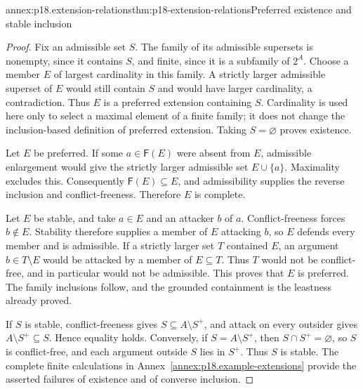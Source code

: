 \begin{annexitem}{annex:p18.extension-relations}{thm:p18-extension-relations}{Preferred existence and stable inclusion}
\begin{proof}
Fix an admissible set \(S\). The family of its admissible supersets is
nonempty, since it contains \(S\), and finite, since it is a subfamily
of \(2^A\). Choose a member \(E\) of largest cardinality in this
family. A strictly larger admissible superset of \(E\) would still
contain \(S\) and would have larger cardinality, a contradiction.
Thus \(E\) is a preferred extension containing \(S\). Cardinality is
used here only to select a maximal element of a finite family; it does not
change the inclusion-based definition of preferred extension. Taking
\(S=\varnothing\) proves existence.

Let \(E\) be preferred. If some \(a\in\mathsf F(E)\) were absent
from \(E\), admissible enlargement would give the strictly larger
admissible set \(E\cup\{a\}\). Maximality excludes this. Consequently
\(\mathsf F(E)\subseteq E\), and admissibility supplies the reverse
inclusion and conflict-freeness. Therefore \(E\) is complete.

Let \(E\) be stable, and take \(a\in E\) and an attacker \(b\)
of \(a\). Conflict-freeness forces \(b\notin E\). Stability therefore
supplies a member of \(E\) attacking \(b\), so \(E\) defends every
member and is admissible. If a strictly larger set \(T\) contained
\(E\), an argument \(b\in T\setminus E\) would be attacked by a
member of \(E\subseteq T\). Thus \(T\) would not be conflict-free,
and in particular would not be admissible. This proves that \(E\) is
preferred. The family inclusions follow, and the grounded containment is
the leastness already proved.

If \(S\) is stable, conflict-freeness gives
\(S\subseteq A\setminus S^+\), and attack on every outsider gives
\(A\setminus S^+\subseteq S\). Hence equality holds.
Conversely, if \(S=A\setminus S^+\), then \(S\cap S^+=\varnothing\),
so \(S\) is conflict-free, and each argument outside \(S\) lies in
\(S^+\). Thus \(S\) is stable. The complete finite calculations in
Annex~\ref{annex:p18.example-extensions} provide the asserted failures of
existence and of converse inclusion.
\end{proof}
\end{annexitem}

